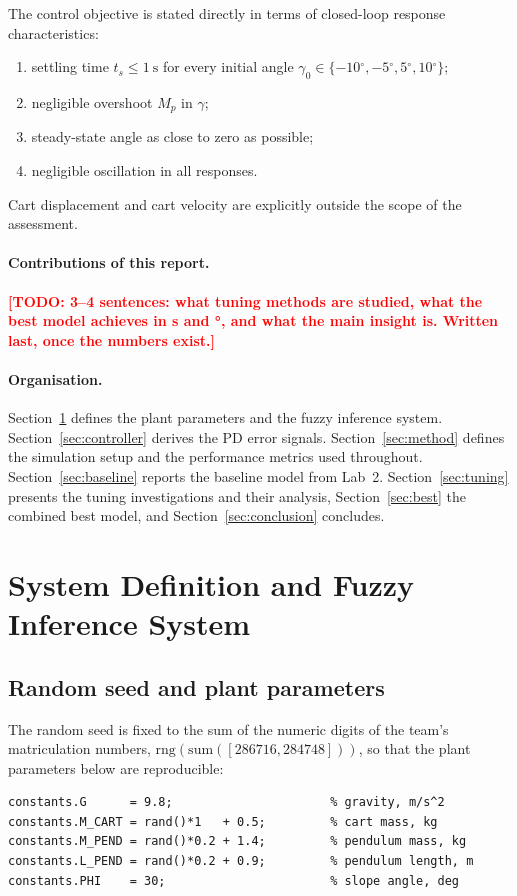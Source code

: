 \documentclass[11pt,a4paper]{article}
\newcommand{\todo}[1]{\textcolor{red}{\textbf{[TODO: #1]}}}
\newcommand{\degC}{\ensuremath{^\circ}}
\newcommand{\gam}{\ensuremath{\gamma}}
\newcommand{\ts}{\ensuremath{t_s}}
\newcommand{\overshoot}{\ensuremath{M_p}}
\begin{document}
The control objective is stated directly in terms of closed-loop response
characteristics:
\begin{enumerate}[label=(\arabic*),leftmargin=*]
  \item settling time $\ts \le \SI{1}{\s}$ for every initial angle
        $\gam_0 \in \{-10\degC, -5\degC, 5\degC, 10\degC\}$;
  \item negligible overshoot $\overshoot$ in $\gam$;
  \item steady-state angle as close to zero as possible;
  \item negligible oscillation in all responses.
\end{enumerate}
Cart displacement and cart velocity are explicitly outside the scope of the
assessment.

\paragraph{Contributions of this report.}
\todo{3--4 sentences: what tuning methods are studied, what the best model
achieves in \si{\s} and \si{\degree}, and what the main insight is. Written
last, once the numbers exist.}

\paragraph{Organisation.}
Section~\ref{sec:defs} defines the plant parameters and the fuzzy inference
system. Section~\ref{sec:controller} derives the PD error signals.
Section~\ref{sec:method} defines the simulation setup and the performance
metrics used throughout. Section~\ref{sec:baseline} reports the baseline model
from Lab~2. Section~\ref{sec:tuning} presents the tuning investigations and
their analysis, Section~\ref{sec:best} the combined best model, and
Section~\ref{sec:conclusion} concludes.

\section{System Definition and Fuzzy Inference System}
\label{sec:defs}

\subsection{Random seed and plant parameters}
\label{sec:params}

The random seed is fixed to the sum of the numeric digits of the team's
matriculation numbers, $\mathrm{rng}(\mathrm{sum}([286716, 284748]))$, so that
the plant parameters below are reproducible:
\begin{verbatim}
constants.G      = 9.8;                      % gravity, m/s^2
constants.M_CART = rand()*1   + 0.5;         % cart mass, kg
constants.M_PEND = rand()*0.2 + 1.4;         % pendulum mass, kg
constants.L_PEND = rand()*0.2 + 0.9;         % pendulum length, m
constants.PHI    = 30;                       % slope angle, deg
\end{verbatim}
\end{document}
